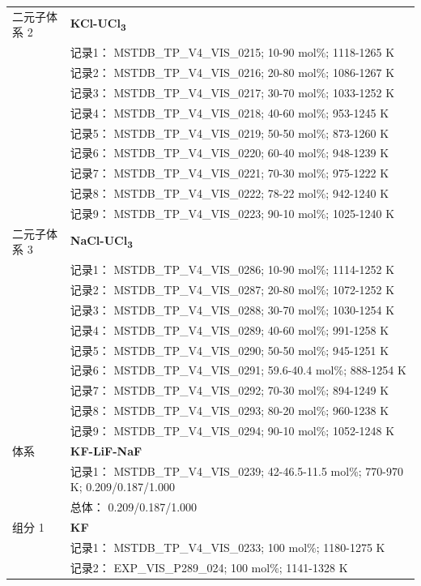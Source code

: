 \documentclass[12pt]{article}
\begin{document}
{\begin{longtable}[]{@{}
  >{\raggedright\arraybackslash}p{}
  >{\raggedright\arraybackslash}p{}@{}}
二元子体系 2  & \textbf{KCl-UCl\textsubscript{3}} \\
 & 记录1： MSTDB\_TP\_V4\_VIS\_0215; 10-90 mol\%; 1118-1265 K \\
 & 记录2： MSTDB\_TP\_V4\_VIS\_0216; 20-80 mol\%; 1086-1267 K \\
 & 记录3： MSTDB\_TP\_V4\_VIS\_0217; 30-70 mol\%; 1033-1252 K \\
 & 记录4： MSTDB\_TP\_V4\_VIS\_0218; 40-60 mol\%; 953-1245 K \\
 & 记录5： MSTDB\_TP\_V4\_VIS\_0219; 50-50 mol\%; 873-1260 K \\
 & 记录6： MSTDB\_TP\_V4\_VIS\_0220; 60-40 mol\%; 948-1239 K \\
 & 记录7： MSTDB\_TP\_V4\_VIS\_0221; 70-30 mol\%; 975-1222 K \\
 & 记录8： MSTDB\_TP\_V4\_VIS\_0222; 78-22 mol\%; 942-1240 K \\
 & 记录9： MSTDB\_TP\_V4\_VIS\_0223; 90-10 mol\%; 1025-1240 K  \\

二元子体系 3  & \textbf{NaCl-UCl\textsubscript{3}} \\
 & 记录1： MSTDB\_TP\_V4\_VIS\_0286; 10-90 mol\%; 1114-1252 K \\
 & 记录2： MSTDB\_TP\_V4\_VIS\_0287; 20-80 mol\%; 1072-1252 K \\
 & 记录3： MSTDB\_TP\_V4\_VIS\_0288; 30-70 mol\%; 1030-1254 K \\
 & 记录4： MSTDB\_TP\_V4\_VIS\_0289; 40-60 mol\%; 991-1258 K \\
 & 记录5： MSTDB\_TP\_V4\_VIS\_0290; 50-50 mol\%; 945-1251 K \\
 & 记录6： MSTDB\_TP\_V4\_VIS\_0291; 59.6-40.4 mol\%; 888-1254 K \\
 & 记录7： MSTDB\_TP\_V4\_VIS\_0292; 70-30 mol\%; 894-1249 K \\
 & 记录8： MSTDB\_TP\_V4\_VIS\_0293; 80-20 mol\%; 960-1238 K \\
 & 记录9： MSTDB\_TP\_V4\_VIS\_0294; 90-10 mol\%; 1052-1248 K  \\

\midrule
体系 & \textbf{KF-LiF-NaF} \\
 & 记录1： MSTDB\_TP\_V4\_VIS\_0239; 42-46.5-11.5 mol\%; 770-970 K; 0.209/0.187/1.000 \\
 & 总体： 0.209/0.187/1.000  \\

组分 1  & \textbf{KF} \\
 & 记录1： MSTDB\_TP\_V4\_VIS\_0233; 100 mol\%; 1180-1275 K \\
 & 记录2： EXP\_VIS\_P289\_024; 100 mol\%; 1141-1328 K  \\


\end{longtable}}
\end{document}
